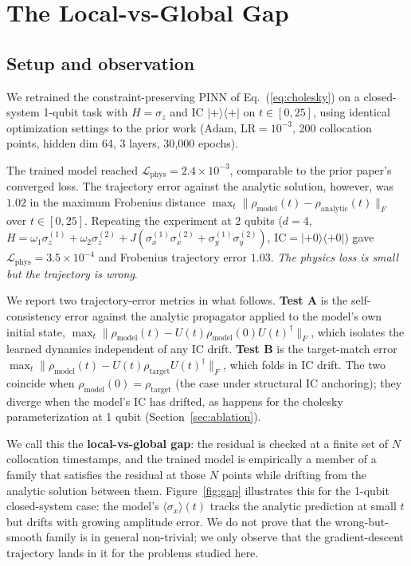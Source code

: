 \documentclass[11pt]{article}
\begin{document}
\section{The Local-vs-Global Gap}

\subsection{Setup and observation}

We retrained the constraint-preserving PINN of Eq.~(\ref{eq:cholesky}) on a closed-system 1-qubit task with $H = \sigma_z$ and IC $|+\rangle\langle+|$ on $t \in [0, 25]$, using identical optimization settings to the prior work ($\mathrm{Adam}$, $\mathrm{LR} = 10^{-3}$, 200 collocation points, hidden dim 64, 3 layers, 30{,}000 epochs).

The trained model reached $\mathcal{L}_{\mathrm{phys}} = 2.4 \times 10^{-3}$, comparable to the prior paper's converged loss. The trajectory error against the analytic solution, however, was $1.02$ in the maximum Frobenius distance $\max_t \| \rho_{\mathrm{model}}(t) - \rho_{\mathrm{analytic}}(t) \|_F$ over $t \in [0, 25]$. Repeating the experiment at 2 qubits ($d=4$, $H = \omega_1 \sigma_z^{(1)} + \omega_2 \sigma_z^{(2)} + J(\sigma_x^{(1)} \sigma_x^{(2)} + \sigma_y^{(1)} \sigma_y^{(2)})$, $\mathrm{IC} = |+0\rangle\langle+0|$) gave $\mathcal{L}_{\mathrm{phys}} = 3.5 \times 10^{-4}$ and Frobenius trajectory error $1.03$. \emph{The physics loss is small but the trajectory is wrong}.

We report two trajectory-error metrics in what follows. \textbf{Test A} is the self-consistency error against the analytic propagator applied to the model's own initial state, $\max_t \| \rho_{\mathrm{model}}(t) - U(t) \rho_{\mathrm{model}}(0) U(t)^\dagger \|_F$, which isolates the learned dynamics independent of any IC drift. \textbf{Test B} is the target-match error $\max_t \| \rho_{\mathrm{model}}(t) - U(t) \rho_{\mathrm{target}} U(t)^\dagger \|_F$, which folds in IC drift. The two coincide when $\rho_{\mathrm{model}}(0) = \rho_{\mathrm{target}}$ (the case under structural IC anchoring); they diverge when the model's IC has drifted, as happens for the cholesky parameterization at 1 qubit (Section~\ref{sec:ablation}).

We call this the \textbf{local-vs-global gap}: the residual is checked at a finite set of $N$ collocation timestamps, and the trained model is empirically a member of a family that satisfies the residual at those $N$ points while drifting from the analytic solution between them. Figure~\ref{fig:gap} illustrates this for the 1-qubit closed-system case: the model's $\langle \sigma_x \rangle(t)$ tracks the analytic prediction at small $t$ but drifts with growing amplitude error. We do not prove that the wrong-but-smooth family is in general non-trivial; we only observe that the gradient-descent trajectory lands in it for the problems studied here.
\end{document}
